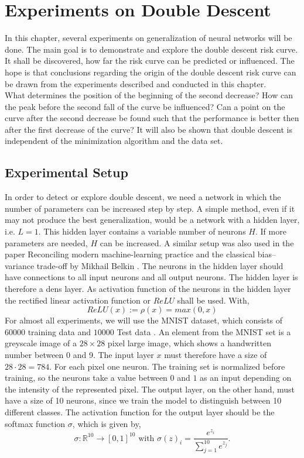 \chapter{Experiments on Double Descent}
\label{experimental_part}

In this chapter, several experiments on generalization of neural networks will be done. The main goal is to demonstrate and explore the double descent risk curve. It shall be discovered, how far the risk curve can be predicted or influenced. The hope is that conclusions regarding the origin of the double descent risk curve can be drawn from the experiments described and conducted in this chapter.\\
What determines the position of the beginning of the second decrease? How can the peak before the second fall of the curve be influenced? Can a point on the curve after the second decrease be found such that the performance is better then after the first decrease of the curve?  It will also be shown that double descent is independent of the minimization algorithm and the data set.

\section{Experimental Setup}

In order to detect or explore double descent, we need a network in which the number of parameters can be increased step by step. A simple method, even if it may not produce the best generalization, would be a network with a hidden layer, i.e. $L = 1$. This hidden layer contains a variable number of neurons $H$. If more parameters are needed, $H$ can be increased. A similar setup was also used in the paper Reconciling modern machine-learning practice and the classical bias–variance trade-off by Mikhail Belkin \cite{belkin}. The neurons in the hidden layer should have connections to all input neurons and all output neurons. The hidden layer is therefore a dens layer. As activation function of the neurons in the hidden layer the  rectified linear activation function or $ReLU$ shall be used. With,
$$
ReLU(x) := \rho(x) = max(0,x)
$$
For almost all experiments, we will use the MNIST dataset, which consists of $60000$ training data and $10000$ Test data \cite{wikipedia_Mnist-Datenbank}. An element from the MNIST set is a greyscale image of a $28 \times 28$ pixel large image, which shows a handwritten number between 0 and 9. The input layer $x$ must therefore have a size of $28 \cdot 28 = 784$. For each pixel one neuron. The training set is normalized before training, so the neurons take a value between $0$ and $1$ as an input depending on the intensity of the represented pixel. The output layer, on the other hand, must have a size of 10 neurons, since we train the model to distinguish between 10 different classes. The activation function for the output layer should be the softmax function $\sigma$, which is given by,
$$
\sigma : \mathbb{R}^{10} \xrightarrow{} [0,1]^{10} \text{ with } \sigma(z)_i = \frac{e^{z_i}}{\sum_{j = 1}^{10}e^{z_j}}.
$$

